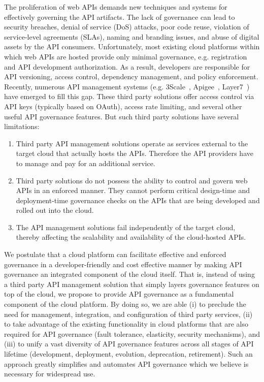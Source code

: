 The proliferation of web APIs demands new techniques and systems for 
effectively governing the API artifacts.
The lack of governance can lead to 
security breaches, denial of service (DoS)
attacks, poor code reuse, violation of service-level agreements (SLAs), 
naming and branding issues, and abuse of digital 
assets by the API consumers. Unfortunately, most existing cloud platforms
within which web APIs are hosted provide only minimal governance, e.g.
registration and API development authorization.
As a result, developers are responsible for API versioning, access control,
dependency management, and policy enforcement. Recently, numerous 
API management systems (e.g. 3Scale~\cite{3scale}, Apigee~\cite{apigee},
Layer7~\cite{layer7}) have emerged to fill this gap. 
These third party solutions offer access control
via API keys (typically based on OAuth), access rate limiting, and 
several other useful API governance features. But such third party 
solutions have several limitations:
\begin{enumerate}
\item Third party API management solutions operate as services external to the target cloud that actually hosts the APIs. Therefore 
the API providers have to manage and pay for an additional service.
\item Third party solutions do not possess the ability to control and govern web APIs in an enforced manner. They cannot perform 
critical design-time and deployment-time governance checks on the APIs that are being developed and rolled out into the cloud. 
\item The API management solutions fail independently of the target cloud, thereby affecting the scalability and availability of the 
cloud-hosted APIs. 
\end{enumerate}

We postulate that a cloud platform can facilitate effective and 
enforced governance in a developer-friendly and cost effective manner by
making API governance an integrated component of the cloud itself. 
That is, instead of using a third party API management
solution that simply layers governance features on top of the cloud, 
we propose to provide API governance as a fundamental component of the cloud
platform.  By doing so, we are able (i) to preclude the need for management,
integration, and configuration of third party services, (ii) to take advantage
of the existing functionality in cloud platforms that are also required for 
API governance (fault tolerance, elasticity, security mechanisms), and (iii)
to unify a vast diversity of API
governance features across all stages of API lifetime
(development, deployment, evolution, deprecation, retirement). Such an
approach greatly simplifies and automates API governance which we believe
is necessary for widespread use.

